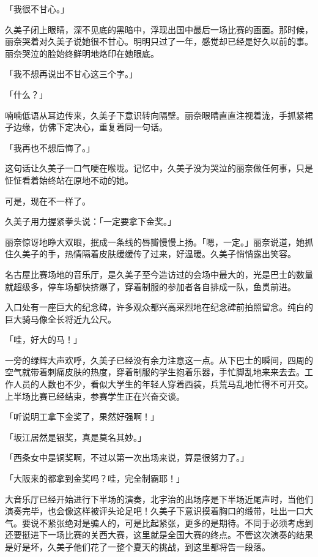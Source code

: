 \documentclass[UTF8]{ctexart}
\begin{document}
    「我很不甘心。」 

    久美子闭上眼睛，深不见底的黑暗中，浮现出国中最后一场比赛的画面。那时候，丽奈哭着对久美子说她很不甘心。明明只过了一年，感觉却已经是好久以前的事。丽奈哭泣的脸始终鲜明地烙印在她眼底。 

    「我不想再说出不甘心这三个字。」 

    「什么？」 

    喃喃低语从耳边传来，久美子下意识转向隔壁。丽奈眼睛直直注视着泷，手抓紧裙子边缘，仿佛下定决心，重复着同一句话。 

    「我再也不想后悔了。」 

    这句话让久美子一口气哽在喉咙。记忆中，久美子没为哭泣的丽奈做任何事，只是怔怔看着始终站在原地不动的她。 

    可是，现在不一样了。 

    久美子用力握紧拳头说：「一定要拿下金奖。」 

    丽奈惊讶地睁大双眼，抿成一条线的唇瓣慢慢上扬。「嗯，一定。」丽奈说道，她抓住久美子的手，热情隔着皮肤缓缓传了过来，好温暖。久美子悄悄露出笑容。 

    名古屋比赛场地的音乐厅，是久美子至今造访过的会场中最大的，光是巴士的数量就超级多，停车场都快挤爆了，穿着制服的参加者各自排成一队，鱼贯前进。 

    入口处有一座巨大的纪念碑，许多观众都兴高采烈地在纪念碑前拍照留念。纯白的巨大骑马像全长将近九公尺。 

    「哇，好大的马！」 

    一旁的绿辉大声欢呼，久美子已经没有余力注意这一点。从下巴士的瞬间，四周的空气就带着刺痛皮肤的热度，穿着制服的学生抱着乐器，手忙脚乱地来来去去。工作人员的人数也不少，看似大学生的年轻人穿着西装，兵荒马乱地忙得不可开交。上半场比赛已经结束，参赛学生正在兴奋交谈。 

    「听说明工拿下金奖了，果然好强啊！」 

    「坂江居然是银奖，真是莫名其妙。」 

    「西条女中是铜奖啊，不过以第一次出场来说，算是很努力了。」 

    「大阪来的都拿到金奖吗？哇，完全制霸耶！」 

    大音乐厅已经开始进行下半场的演奏，北宇治的出场序是下半场近尾声时，当他们演奏完毕，也会像这样被评头论足吧！久美子下意识摸着胸口的缎带，吐出一口大气。要说不紧张绝对是骗人的，可是比起紧张，更多的是期待。不同于必须考虑到还要挺进下一场比赛的关西大赛，这里就是全国大赛的终点。不管这次演奏的结果是好是坏，久美子他们花了一整个夏天的挑战，到这里都将告一段落。 
\end{document}
